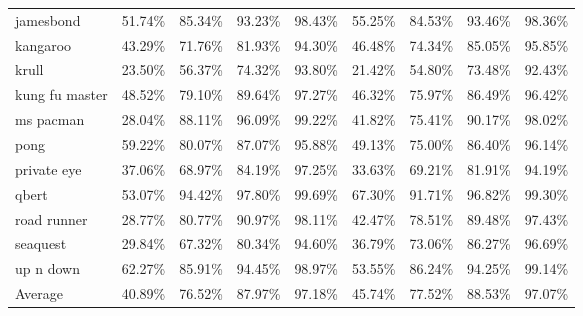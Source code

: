 \begin{table}[h!]
{\begin{tabular}{l|rrrr|rrrr}
        jamesbond & 51.74\% & 85.34\% & 93.23\% & 98.43\% & 55.25\% & 84.53\% & 93.46\% & 98.36\% \\
        kangaroo & 43.29\% & 71.76\% & 81.93\% & 94.30\% & 46.48\% & 74.34\% & 85.05\% & 95.85\% \\
        krull & 23.50\% & 56.37\% & 74.32\% & 93.80\% & 21.42\% & 54.80\% & 73.48\% & 92.43\% \\
        kung fu master & 48.52\% & 79.10\% & 89.64\% & 97.27\% & 46.32\% & 75.97\% & 86.49\% & 96.42\% \\
        ms pacman & 28.04\% & 88.11\% & 96.09\% & 99.22\% & 41.82\% & 75.41\% & 90.17\% & 98.02\% \\
        pong & 59.22\% & 80.07\% & 87.07\% & 95.88\% & 49.13\% & 75.00\% & 86.40\% & 96.14\% \\
        private eye & 37.06\% & 68.97\% & 84.19\% & 97.25\% & 33.63\% & 69.21\% & 81.91\% & 94.19\% \\
        qbert & 53.07\% & 94.42\% & 97.80\% & 99.69\% & 67.30\% & 91.71\% & 96.82\% & 99.30\% \\
        road runner & 28.77\% & 80.77\% & 90.97\% & 98.11\% & 42.47\% & 78.51\% & 89.48\% & 97.43\% \\
        seaquest & 29.84\% & 67.32\% & 80.34\% & 94.60\% & 36.79\% & 73.06\% & 86.27\% & 96.69\% \\
        up n down & 62.27\% & 85.91\% & 94.45\% & 98.97\% & 53.55\% & 86.24\% & 94.25\% & 99.14\% \\
        \midrule
        Average & 40.89\% & 76.52\% & 87.97\% & 97.18\% & 45.74\% & 77.52\% & 88.53\% & 97.07\% \\
\bottomrule
    \end{tabular}
    }
    \label{tab:option-topk-usage-op3-op6}
\end{table}

